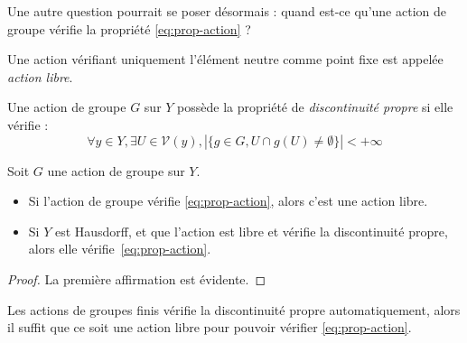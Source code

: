 Une autre question pourrait se poser désormais : quand est-ce qu'une action de groupe vérifie la propriété \eqref{eq:prop-action} ?

\begin{definition}
Une action vérifiant uniquement l'élément neutre comme point fixe est appelée \emph{action libre}.

Une action de groupe $G$ sur $Y$ possède la propriété de \emph{discontinuité propre} si elle vérifie : \[\forall y\in Y,\exists U\in\mathcal{V}(y), |\{g\in G,U\cap g(U)\neq\emptyset\}|<+\infty\]
\end{definition}

\begin{proposition}
Soit $G$ une action de groupe sur $Y$.\begin{itemize}
    \item Si l'action de groupe vérifie \eqref{eq:prop-action}, alors c'est une action libre.
    \item Si $Y$ est Hausdorff, et que l'action est libre et vérifie la discontinuité propre, alors elle vérifie~\eqref{eq:prop-action}.
\end{itemize}
\end{proposition}
\begin{proof}
La première affirmation est évidente.
\end{proof}

\begin{exemple}
Les actions de groupes finis vérifie la discontinuité propre automatiquement, alors il suffit que ce soit une action libre pour pouvoir vérifier \eqref{eq:prop-action}.
\end{exemple}